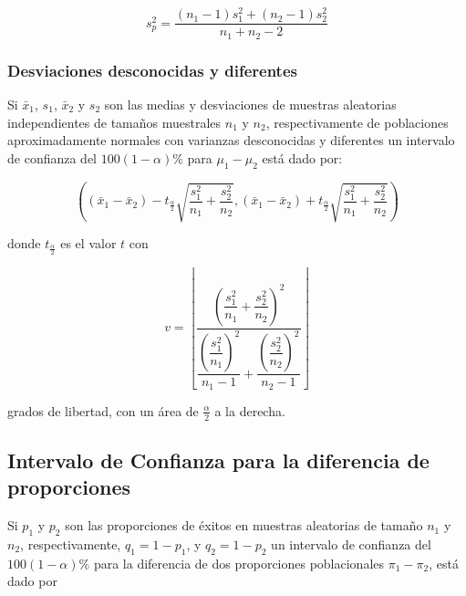 \documentclass[]{book}
\begin{document}
\begin{equation} 
s_p^2 = \dfrac{\left(n_1 - 1 \right)s_1^2+\left(n_2 - 1 \right)s_2^2}{n_1 +n_2 -2} 
\label{eq:sp}
\end{equation}

\subsubsection{Desviaciones desconocidas y
diferentes}\label{desviaciones-desconocidas-y-diferentes}

Si \(\bar{x}_1\), \(s_1\), \(\bar{x}_2\) y \(s_2\) son las medias y
desviaciones de muestras aleatorias independientes de tamaños muestrales
\(n_1\) y \(n_2\), respectivamente de poblaciones aproximadamente
normales con varianzas desconocidas y diferentes un intervalo de
confianza del \(100\left(1-\alpha \right)\%\) para \(\mu_1 - \mu_2\)
está dado por:

\begin{equation} 
\left( \left( \bar{x}_1 - \bar{x}_2 \right) - t_{\frac{\alpha}{2}}\sqrt{\dfrac{s_1^2}{n_1} + \dfrac{s_2^2}{n_2}} , \left( \bar{x}_1 - \bar{x}_2 \right) + t_{\frac{\alpha}{2}}\sqrt{\dfrac{s_1^2}{n_1} + \dfrac{s_2^2}{n_2}} \right) 
\label{eq:ic2msdd}
\end{equation}

donde \(t_{\frac{\alpha}{2}}\) es el valor \(t\) con

\begin{equation} 
v = \left\lfloor\dfrac{\left(\dfrac{s_1^2}{n_1} + \dfrac{s_2^2}{n_2} \right)^2}{\dfrac{\left( \dfrac{s_1^2}{n_1} \right)^2}{n_1-1}+\dfrac{\left( \dfrac{s_2^2}{n_2} \right)^2}{n_2-1}}\right\rfloor
\label{eq:dfsdd}
\end{equation}

grados de libertad, con un área de \(\frac{\alpha}{2}\) a la derecha.

\subsection{Intervalo de Confianza para la diferencia de
proporciones}\label{intervalo-de-confianza-para-la-diferencia-de-proporciones}

Si \(p_1\) y \(p_2\) son las proporciones de éxitos en muestras
aleatorias de tamaño \(n_1\) y \(n_2\), respectivamente,
\(q_1 = 1- p_1\), y \(q_2 = 1- p_2\) un intervalo de confianza del
\(100\left(1- \alpha \right)\%\) para la diferencia de dos proporciones
poblacionales \(\pi_1-\pi_2\), está dado por
\end{document}
